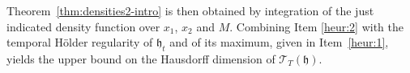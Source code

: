 \documentclass[oneside,final,11pt]{amsart}
\theoremstyle{definition}
\newcommand{\fh}{\mathfrak{h}}
\newcommand{\TPno}{\mathsf{TP}}
\newcommand{\R}{\mathbb{R}}
\newcommand{\CT}{\mathcal{T}}
\newcommand{\1}[1]{\mathbf{1}_{#1}}
\newcommand{\eps}{\varepsilon}
\renewcommand{\epsilon}{\varepsilon}
\newcommand{\Max}{\mathrm{Max}}
\renewcommand{\P}{\mathbb P}
\numberwithin{equation}{section}
\begin{document}
 Theorem~\ref{thm:densities2-intro} is then obtained by integration of the just indicated density function over $x_1$, $x_2$ and $M$. %
%
Combining Item \ref{heur:2} with the temporal H\"older regularity of $\fh_t$ and of its maximum, given in Item~\ref{heur:1}, yields the upper bound on the Hausdorff dimension of $\CT_T(\fh)$.


\end{document}
